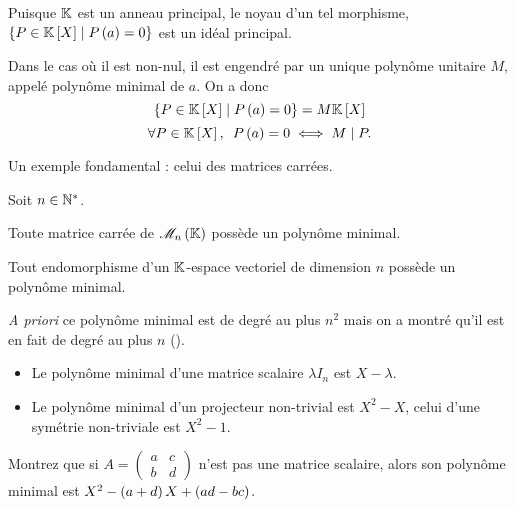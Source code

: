 Puisque \(\mathbb{K}\) est un anneau principal, le noyau d'un tel morphisme, \ie \(\accol{P\in\poly\tq P\paren{a}=0}\) est un idéal principal.

Dans le cas où il est non-nul, il est engendré par un unique polynôme unitaire \(M\), appelé polynôme minimal de \(a\). On a donc \[\accol{P\in\poly\tq P\paren{a}=0}=M\poly\] \cad \[\quantifs{\forall P\in\poly}P\paren{a}=0\ssi M\divise P.\]

Un exemple fondamental : celui des matrices carrées.

\begin{theo}
Soit \(n\in\mathbb{N}^*\).

Toute matrice carrée de \(\M{n}\) possède un polynôme minimal.

Tout endomorphisme d'un \(\mathbb{K}\)-espace vectoriel de dimension \(n\) possède un polynôme minimal.
\end{theo}

\textit{A priori} ce polynôme minimal est de degré au plus \(n^2\) mais on a montré qu'il est en fait de degré au plus \(n\) (\cf {}).

\begin{ex}
\begin{itemize}
    \item Le polynôme minimal d'une matrice scalaire \(\lambda I_n\) est \(X-\lambda\). \\
    \item Le polynôme minimal d'un projecteur non-trivial est \(X^2-X\), celui d'une symétrie non-triviale est \(X^2-1\).
\end{itemize}
\end{ex}

\begin{exo}
Montrez que si \(A=\begin{pmatrix}
a & c \\
b & d
\end{pmatrix}\) n'est pas une matrice scalaire, alors son polynôme minimal est \(X^2-\left(a+d\right)X+\left(ad-bc\right)\).
\end{exo}
